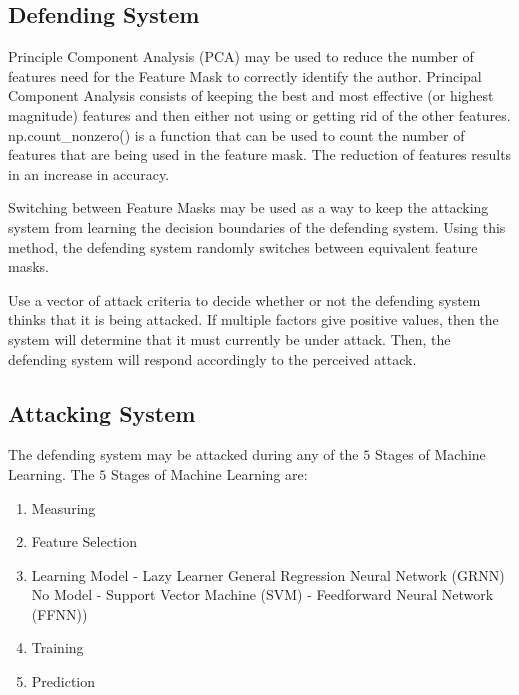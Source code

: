 \documentclass[conference]{IEEEtran}
\begin{document}
\subsection{Defending System}
Principle Component Analysis (PCA) may be used to reduce the number of features need for the Feature Mask to correctly identify the author. Principal Component Analysis consists of keeping the best and most effective (or highest magnitude) features and then either not using or getting rid of the other features. np.count\_nonzero() is a function that can be used to count the number of features that are being used in the feature mask. The reduction of features results in an increase in accuracy. 

Switching between Feature Masks may be used as a way to keep the attacking system from learning the decision boundaries of the defending system. Using this method, the defending system randomly switches between equivalent feature masks. 

Use a vector of attack criteria to decide whether or not the defending system thinks that it is being attacked. If multiple factors give positive values, then the system will determine that it must currently be under attack. Then, the defending system will respond accordingly to the perceived attack. 

\subsection{Attacking System}
The defending system may be attacked during any of the \begin{math}5\end{math} Stages of Machine Learning. The \begin{math}5\end{math} Stages of Machine Learning are: 
\begin{enumerate}
\item Measuring
\item Feature Selection
\item Learning Model 
\subitem - Lazy Learner 
\subsubitem * General Regression Neural Network (GRNN) 
\subsubitem * No Model
\subitem - Support Vector Machine (SVM)
\subitem - Feedforward Neural Network (FFNN))
\item Training
\item Prediction
\end{enumerate}
\end{document}
